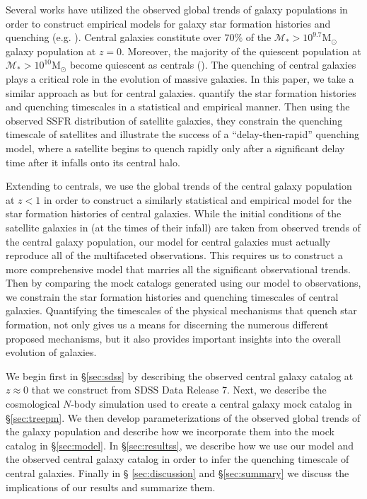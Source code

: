 Several works have utilized the observed global trends of galaxy 
populations in order to construct empirical models for galaxy star 
formation histories and quenching (e.g. \citealt{Wetzel:2013aa, 
Schawinski:2014aa, Smethurst:2015aa}).
Central galaxies constitute over $70\%$ of the 
$\mathcal{M}_* > 10^{9.7}\mathrm{M}_\odot$ galaxy population at $z = 0$. 
Moreover, the majority of the quiescent population at  
$\mathcal{M}_* > 10^{10}\mathrm{M}_\odot$ become quiescent as 
centrals (\citealt{Wetzel:2013aa}). The quenching of central 
galaxies plays a critical role in the evolution of massive galaxies. 
In this paper, we take a similar approach as \cite{Wetzel:2013aa} but 
for central galaxies. 
\cite{Wetzel:2013aa}
quantify the star formation histories and quenching timescales in 
a statistical and empirical manner. Then using the observed SSFR 
distribution of satellite galaxies, they constrain the quenching 
timescale of satellites and illustrate the success 
of a ``delay-then-rapid'' quenching model, where a satellite begins
to quench rapidly only after a significant delay time after it 
infalls onto its central halo.

Extending to centrals, we use the global trends of 
the central galaxy population at $z < 1$ in order 
to construct a similarly statistical and empirical model for the star 
formation histories of central galaxies. While the initial conditions 
of the satellite galaxies in \cite{Wetzel:2013aa} (at the times
of their infall) are taken from observed trends of the central 
galaxy population, 
our model for central galaxies must actually reproduce all of the 
multifaceted observations. This requires us to construct
a more comprehensive model that marries all the significant 
observational trends. Then by comparing the mock 
catalogs generated using our model to observations, we constrain 
the star formation histories and quenching timescales of central galaxies. 
Quantifying the timescales of the physical mechanisms that quench 
star formation, not only gives us a means for discerning the numerous
different proposed mechanisms, but it also provides important insights 
into the overall evolution of galaxies. 

We begin first in \S \ref{sec:sdss} by describing the observed 
central galaxy catalog at $z \approx 0$ that we construct from 
SDSS Data Release 7. Next, we describe the cosmological $N$-body simulation 
used to create a central galaxy mock catalog in \S \ref{sec:treepm}. 
We then develop parameterizations of the observed global trends of the
galaxy population and describe how we incorporate them into the mock catalog
in \S \ref{sec:model}. In \S \ref{sec:resultss}, we describe
how we use our model and the observed central galaxy catalog in order to 
infer the quenching timescale of central galaxies. Finally in \S
\ref{sec:discussion} and \S \ref{sec:summary} we discuss the implications of
our results and summarize them. 

